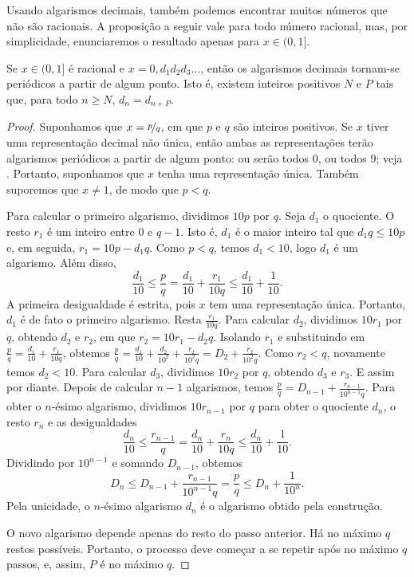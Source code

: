Usando algarismos decimais, também podemos encontrar muitos números que não são racionais.
A proposição a seguir vale para todo
número racional, mas, por simplicidade, enunciaremos o resultado apenas para $x \in (0,1]$.

\begin{prop} \label{prop:rationaldecimal}
Se $x \in (0,1]$ é racional e $x = 0{,}d_1d_2d_3\ldots$,
então os algarismos decimais tornam-se periódicos a partir de algum ponto. Isto é, existem
inteiros positivos $N$ e $P$ tais que, para todo $n \geq N$, $d_n = d_{n+P}$.
\end{prop}

\begin{proof}
Suponhamos que $x = \nicefrac{p}{q}$, em que $p$ e $q$ são inteiros positivos.
Se $x$ tiver uma representação decimal não única, então ambas as representações
terão algarismos periódicos a partir de algum ponto:
ou serão todos $0$, ou todos $9$;
veja .
Portanto, suponhamos que $x$ tenha uma representação única.
Também suporemos que $x \neq 1$, de modo que $p < q$.

Para calcular o primeiro algarismo, dividimos $10p$ por
$q$. Seja $d_1$ o quociente.
O resto $r_1$ é um inteiro
entre $0$ e $q-1$. Isto é, $d_1$ é o maior inteiro
tal que $d_1 q \leq 10p$ e, em seguida, $r_1 = 10p - d_1q$.
Como $p < q$, temos $d_1 < 10$, logo $d_1$ é um algarismo.
Além disso,
\begin{equation*}
\frac{d_1}{10} \leq \frac{p}{q} =
\frac{d_1}{10} + \frac{r_1}{10q} \leq \frac{d_1}{10} +
\frac{1}{10} .
\end{equation*}
A primeira desigualdade é estrita, pois $x$ tem uma
representação única. Portanto, $d_1$ é de fato o primeiro algarismo.
Resta $\frac{r_1}{10q}$.
Para calcular $d_2$, dividimos $10r_1$ por $q$, obtendo $d_2$
e $r_2$, em que $r_2 = 10r_1 - d_2 q$.
Isolando $r_1$ e substituindo em
$\frac{p}{q} = \frac{d_1}{10} + \frac{r_1}{10 q}$,
obtemos
$\frac{p}{q} = \frac{d_1}{10} + \frac{d_2}{{10}^2} +
\frac{r_2}{{10}^2 q} = D_2 +
\frac{r_2}{{10}^2 q}$.
Como $r_2 < q$, novamente temos $d_2 < 10$.
Para calcular $d_3$, dividimos $10r_2$ por $q$,
obtendo $d_3$ e $r_3$. E assim por diante.
Depois de calcular $n-1$ algarismos, temos
$\frac{p}{q} = D_{n-1} + \frac{r_{n-1}}{10^{n-1} q}$.
Para obter o $n$-ésimo algarismo,
dividimos $10r_{n-1}$ por $q$
para obter o quociente $d_n$, o resto $r_n$ e as desigualdades
\begin{equation*}
\frac{d_n}{10} \leq \frac{r_{n-1}}{q} =
\frac{d_n}{10} + \frac{r_n}{10q} \leq \frac{d_n}{10} +
\frac{1}{10} .
\end{equation*}
Dividindo por $10^{n-1}$ e somando $D_{n-1}$, obtemos
\begin{equation*}
D_n \leq D_{n-1} + \frac{r_{n-1}}{10^{n-1} q} = \frac{p}{q} \leq D_n +
\frac{1}{10^n} .
\end{equation*}
Pela unicidade, o $n$-ésimo algarismo $d_n$ é o algarismo obtido pela construção.

O novo algarismo depende apenas do resto do passo anterior.
Há no máximo $q$ restos possíveis.
Portanto, o processo deve começar a se repetir após no máximo $q$ passos,
e, assim, $P$ é no máximo $q$.
\end{proof}

